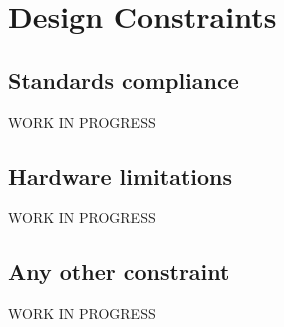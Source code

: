 \documentclass[../../rasd.tex]{subfiles}
\begin{document}
\section{Design Constraints}
			\subsection{Standards compliance}
			WORK IN PROGRESS
			\subsection{Hardware limitations}
			WORK IN PROGRESS
			\subsection{Any other constraint}
			WORK IN PROGRESS
\end{document}
